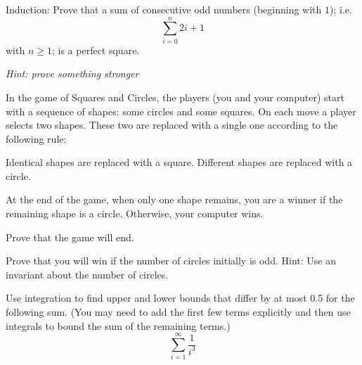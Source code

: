 \documentclass[12pt,oneside]{article}
\begin{document}

\begin{problem}{0}
Induction: Prove that a sum of consecutive odd numbers (beginning with $1$); i.e. $$\sum_{i=0}^{n}2i+1$$ with $n \ge 1$; is a perfect square.

\emph{Hint: prove something stronger}
\end{problem}

\begin{problem}{0}

In the game of Squares and Circles, the players (you and your computer) start with a sequence of shapes: some circles and some squares. On each move a player selects two shapes. These two are replaced with a single one according to the following rule:

Identical shapes are replaced with a square. Different shapes are replaced with a circle.

At the end of the game, when only one shape remains, you are a winner if the remaining shape is a circle. Otherwise, your computer wins. 

\bparts

Prove that the game will end.


Prove that you will win if the number of circles initially is odd. Hint: Use an invariant about the number of circles.
 

\eparts

\end{problem}

\begin{problem}{10}
Use integration to find upper and lower bounds that differ by at most
0.5 for the following sum.  (You may need to add the first few terms
explicitly and then use integrals to bound the sum of the remaining
terms.)
%
\[
\sum_{i=1}^{\infty} \frac{1}{i^3}
\]

\end{problem}
\end{document}
